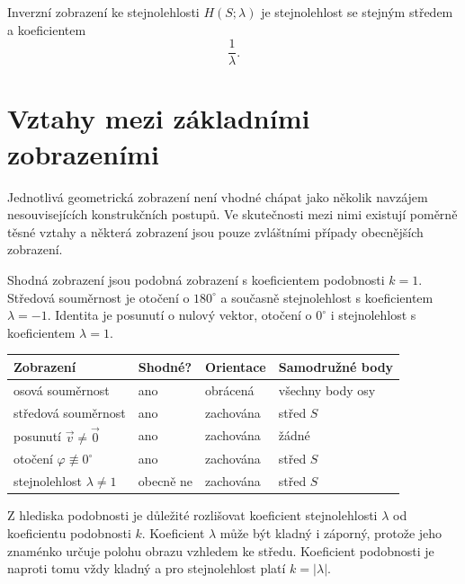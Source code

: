 \documentclass[12pt,a4paper]{article}
\begin{document}
Inverzní zobrazení ke stejnolehlosti $H(S;\lambda)$ je stejnolehlost se stejným středem a koeficientem
\[
    \frac{1}{\lambda}.
\]


\section{Vztahy mezi základními zobrazeními}

Jednotlivá geometrická zobrazení není vhodné chápat jako několik navzájem nesouvisejících konstrukčních postupů. Ve skutečnosti mezi nimi existují poměrně těsné vztahy a některá zobrazení jsou pouze zvláštními případy obecnějších zobrazení.

Shodná zobrazení jsou podobná zobrazení s koeficientem podobnosti $k=1$. Středová souměrnost je otočení o $180^\circ$ a současně stejnolehlost s koeficientem $\lambda=-1$. Identita je posunutí o nulový vektor, otočení o $0^\circ$ i stejnolehlost s koeficientem $\lambda=1$.

\begin{center}
\begin{tabular}{|C{4.0cm}|C{2.6cm}|C{3.2cm}|C{3.7cm}|}
    \hline
    \textbf{Zobrazení} & \textbf{Shodné?} & \textbf{Orientace} & \textbf{Samodružné body} \\
    \hline
    osová souměrnost & ano & obrácená & všechny body osy \\
    \hline
    středová souměrnost & ano & zachována & střed $S$ \\
    \hline
    posunutí $\vec v\neq\vec0$ & ano & zachována & žádné \\
    \hline
    otočení $\varphi\not\equiv0^\circ$ & ano & zachována & střed $S$ \\
    \hline
    stejnolehlost $\lambda\neq1$ & obecně ne & zachována & střed $S$ \\
    \hline
\end{tabular}
\end{center}

\begin{notebox}
    Z hlediska podobnosti je důležité rozlišovat koeficient stejnolehlosti $\lambda$ od koeficientu podobnosti $k$. Koeficient $\lambda$ může být kladný i záporný, protože jeho znaménko určuje polohu obrazu vzhledem ke středu. Koeficient podobnosti je naproti tomu vždy kladný a pro stejnolehlost platí $k=|\lambda|$.
\end{notebox}
\end{document}
